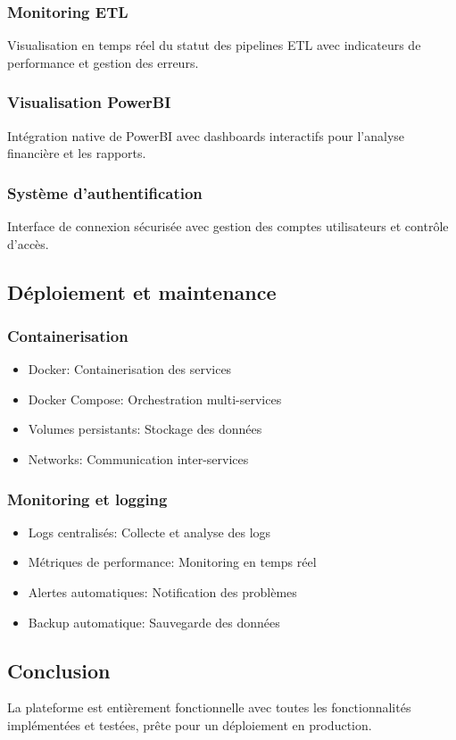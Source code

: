 \subsubsection{Monitoring ETL}
Visualisation en temps réel du statut des pipelines ETL avec indicateurs de performance et gestion des erreurs.

\subsubsection{Visualisation PowerBI}
Intégration native de PowerBI avec dashboards interactifs pour l'analyse financière et les rapports.

\subsubsection{Système d'authentification}
Interface de connexion sécurisée avec gestion des comptes utilisateurs et contrôle d'accès.

\subsection{Déploiement et maintenance}
\subsubsection{Containerisation}
\begin{itemize}
    \item Docker: Containerisation des services
    \item Docker Compose: Orchestration multi-services
    \item Volumes persistants: Stockage des données
    \item Networks: Communication inter-services
\end{itemize}

\subsubsection{Monitoring et logging}
\begin{itemize}
    \item Logs centralisés: Collecte et analyse des logs
    \item Métriques de performance: Monitoring en temps réel
    \item Alertes automatiques: Notification des problèmes
    \item Backup automatique: Sauvegarde des données
\end{itemize}

\subsection{Conclusion}
La plateforme est entièrement fonctionnelle avec toutes les fonctionnalités implémentées et testées, prête pour un déploiement en production.
